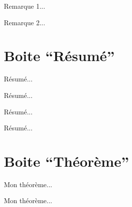 \documentclass[a4paper,12pt]{article}
\begin{document}
\begin{remarques*}
	\item Remarque 1...
	\item Remarque 2...
\end{remarques*}%



	\section{Boite ``Résumé''}

\begin{code}%
\begin{resume}
	Résumé...
\end{resume}
\end{code}

\begin{resume}
	Résumé...
\end{resume}%

\begin{code}%
\begin{resume*}
	Résumé...
\end{resume*}
\end{code}

\begin{resume*}
	Résumé...
\end{resume*}%


	\section{Boite ``Théorème''}

\begin{code}%
\begin{theoreme}
	Mon théorème...
\end{theoreme}
\end{code}

\begin{theoreme}
	Mon théorème...
\end{theoreme}%
\end{document}
